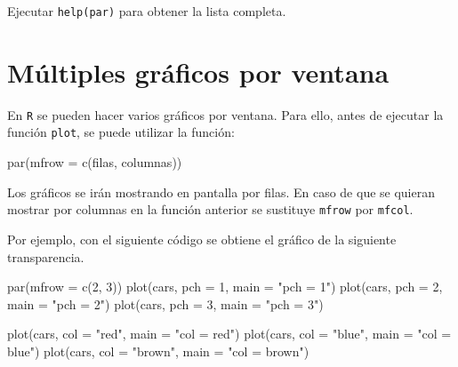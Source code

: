 \documentclass[
]{book}
\newenvironment{Shaded}{\begin{snugshade}}{\end{snugshade}}
\newcommand{\AttributeTok}[1]{\textcolor[rgb]{0.77,0.63,0.00}{#1}}
\newcommand{\DecValTok}[1]{\textcolor[rgb]{0.00,0.00,0.81}{#1}}
\newcommand{\FunctionTok}[1]{\textcolor[rgb]{0.00,0.00,0.00}{#1}}
\newcommand{\NormalTok}[1]{#1}
\newcommand{\StringTok}[1]{\textcolor[rgb]{0.31,0.60,0.02}{#1}}
\theoremstyle{break}
\begin{document}
Ejecutar \texttt{help(par)} para obtener la lista completa.

\hypertarget{muxfaltiples-gruxe1ficos-por-ventana}{%
\section{Múltiples gráficos por ventana}\label{muxfaltiples-gruxe1ficos-por-ventana}}

En \texttt{R} se pueden
hacer varios gráficos por ventana. Para ello, antes de ejecutar la
función \texttt{plot}, se puede utilizar la función:

\begin{Shaded}
\begin{Highlighting}[]
\FunctionTok{par}\NormalTok{(}\AttributeTok{mfrow =} \FunctionTok{c}\NormalTok{(filas, columnas))}
\end{Highlighting}
\end{Shaded}

Los gráficos se irán mostrando en pantalla por filas. En caso de que se
quieran mostrar por columnas en la función anterior se sustituye \texttt{mfrow}
por \texttt{mfcol}.

Por ejemplo, con el siguiente código se obtiene el gráfico de la
siguiente transparencia.

\begin{Shaded}
\begin{Highlighting}[]
\FunctionTok{par}\NormalTok{(}\AttributeTok{mfrow =} \FunctionTok{c}\NormalTok{(}\DecValTok{2}\NormalTok{, }\DecValTok{3}\NormalTok{))}
\FunctionTok{plot}\NormalTok{(cars, }\AttributeTok{pch =} \DecValTok{1}\NormalTok{, }\AttributeTok{main =} \StringTok{"pch = 1"}\NormalTok{)}
\FunctionTok{plot}\NormalTok{(cars, }\AttributeTok{pch =} \DecValTok{2}\NormalTok{, }\AttributeTok{main =} \StringTok{"pch = 2"}\NormalTok{)}
\FunctionTok{plot}\NormalTok{(cars, }\AttributeTok{pch =} \DecValTok{3}\NormalTok{, }\AttributeTok{main =} \StringTok{"pch = 3"}\NormalTok{)}

\FunctionTok{plot}\NormalTok{(cars, }\AttributeTok{col =} \StringTok{"red"}\NormalTok{, }\AttributeTok{main =} \StringTok{"col = red"}\NormalTok{)}
\FunctionTok{plot}\NormalTok{(cars, }\AttributeTok{col =} \StringTok{"blue"}\NormalTok{, }\AttributeTok{main =} \StringTok{"col = blue"}\NormalTok{)}
\FunctionTok{plot}\NormalTok{(cars, }\AttributeTok{col =} \StringTok{"brown"}\NormalTok{, }\AttributeTok{main =} \StringTok{"col = brown"}\NormalTok{)}
\end{Highlighting}
\end{Shaded}
\end{document}
